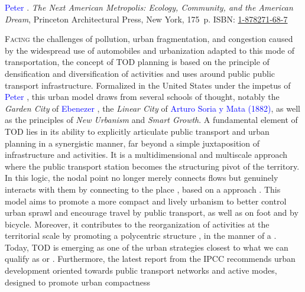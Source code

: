\begin{refsegment}
\begin{displayquote}
\textcolor{blue}{Peter} \textcolor{blue}{\textcite[10-11]{calthorpe_next_1993}}. \foreignlanguage{english}{\textsl{The Next American Metropolis: Ecology, Community, and the American Dream}}, Princeton Architectural Press, New York, 175~p. ISBN: \href{https://search.worldcat.org/fr/title/27814585}{1-878271-68-7}
    \end{displayquote}

\lettrine[lines=3, findent=8pt, nindent=0pt]{ F}{acing} the challenges of pollution, urban fragmentation, and congestion caused by the widespread use of automobiles and urbanization adapted to this mode of transportation, the concept of \acrfull{TOD} planning is based on the principle of densification and diversification of activities and uses around public \gls{public transport} infrastructure. Formalized in the United States under the impetus of \textcolor{blue}{Peter} \textcolor{blue}{\textcite[10]{calthorpe_next_1993}}, this urban model draws from several schools of thought, notably the \textsl{Garden City} of \textcolor{blue}{Ebenezer} \textcolor{blue}{\textcite{howard_-morrow_1898}}, the \textsl{Linear City} of \textcolor{blue}{Arturo Soria y Mata (1882)}, as well as the principles of \textsl{New Urbanism} and \textsl{Smart Growth}. A fundamental element of \acrshort{TOD} lies in its ability to explicitly articulate public transport and urban planning in a synergistic manner, far beyond a simple juxtaposition of infrastructure and activities. It is a multidimensional and multiscale approach where the public transport station becomes the structuring pivot of the territory. In this logic, the nodal point no longer merely connects flows but genuinely interacts with them by connecting to the place \textcolor{blue}{\autocite[344]{bertolini_nodes_1996}}, based on a  approach \textcolor{blue}{\autocite[103]{le_bot_flux_2024}}. This model aims to promote a more compact and lively urbanism to better control urban sprawl and encourage travel by public transport, as well as on foot and by \gls{bicycle}. Moreover, it contributes to the reorganization of activities at the territorial scale by promoting a polycentric structure \textcolor{blue}{\autocite[38]{pearce_enquete_2020}}, in the manner of a  \textcolor{blue}{\autocite[55]{kamruzzaman_advance_2014}}. Today, \acrshort{TOD} is emerging as one of the urban strategies closest to what we can qualify as  or  \textcolor{blue}{\autocite[14]{bentayou_transit-oriented_2015}}. Furthermore, the latest report from the \acrfull{IPCC} recommends urban development oriented towards public transport networks and active modes, designed to promote urban compactness 
\end{refsegment}
